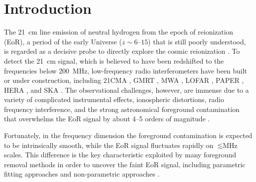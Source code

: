 \documentclass[letters,fleqn,usenatbib,onecolumn]{mnras}
\begin{document}
\section{Introduction}
\label{sec:intro}

The \SI{21}{\cm} line emission of neutral hydrogen from the
epoch of reionization (EoR), a period of the early Universe
($z \sim \numrange{6}{15}$) that is still poorly understood, is regarded
as a decisive probe to directly explore the cosmic reionization
\citep[see][for reviews]{furlanetto2006rev,furlanetto2016rev}.
To detect the \SI{21}{\cm} signal, which is believed to have been
redshifted to the frequencies below \SI{200}{\MHz}, low-frequency
radio interferometers have been built or under construction, including
21CMA \citep{zheng2016}, GMRT \citep{paciga2011}, MWA \citep{tingay2013},
LOFAR \citep{vanHaarlem2013}, PAPER \citep{parsons2010},
HERA \citep{deboer2017}, and SKA \citep{koopmans2015rev}.
The observational challenges, however, are immense due to a variety of
complicated instrumental effects, ionospheric distortions, radio frequency
interference, and the strong astronomical foreground contamination that
overwhelms the EoR signal by about \numrange{4}{5} orders of magnitude
\citep[see][for a review]{morales2010rev}.

Fortunately, in the frequency dimension the foreground contamination
is expected to be intrinsically smooth, while the EoR signal fluctuates
rapidly on $\lesssim \si{\MHz}$ scales.
This difference is the key characteristic exploited by many
foreground removal methods in order to uncover the faint EoR signal,
including parametric fitting approaches
\citep[e.g.,][]{wang2006,liu2009fgrm,wang2013}
and non-parametric approaches
\citep[e.g.,][]{harker2009,chapman2013,mertens2018}.
\end{document}
